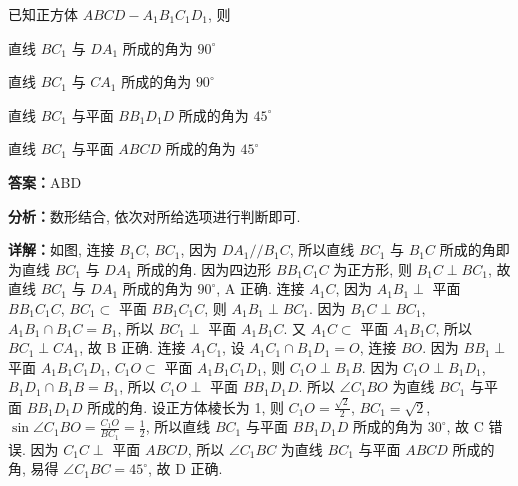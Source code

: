 \begin{question}[points=5]
已知正方体 $ABCD - A_1B_1C_1D_1$, 则
\begin{choices}
  \item 直线 $BC_1$ 与 $DA_1$ 所成的角为 $90^\circ$
  \item 直线 $BC_1$ 与 $CA_1$ 所成的角为 $90^\circ$
  \item 直线 $BC_1$ 与平面 $BB_1D_1D$ 所成的角为 $45^\circ$
  \item 直线 $BC_1$ 与平面 $ABCD$ 所成的角为 $45^\circ$
\end{choices}
\begin{solution}
\textbf{答案：}ABD

\textbf{分析：}数形结合, 依次对所给选项进行判断即可.

\textbf{详解：}如图, 连接 $B_1C$, $BC_1$, 因为 $DA_1 /\!\! / B_1C$, 所以直线 $BC_1$ 与 $B_1C$ 所成的角即为直线 $BC_1$ 与 $DA_1$ 所成的角. 因为四边形 $BB_1C_1C$ 为正方形, 则 $B_1C \perp BC_1$, 故直线 $BC_1$ 与 $DA_1$ 所成的角为 $90^\circ$, A 正确. 连接 $A_1C$, 因为 $A_1B_1 \perp$ 平面 $BB_1C_1C$, $BC_1 \subset$ 平面 $BB_1C_1C$, 则 $A_1B_1 \perp BC_1$. 因为 $B_1C \perp BC_1$, $A_1B_1 \cap B_1C = B_1$, 所以 $BC_1 \perp$ 平面 $A_1B_1C$. 又 $A_1C \subset$ 平面 $A_1B_1C$, 所以 $BC_1 \perp CA_1$, 故 B 正确. 连接 $A_1C_1$, 设 $A_1C_1 \cap B_1D_1 = O$, 连接 $BO$. 因为 $BB_1 \perp$ 平面 $A_1B_1C_1D_1$, $C_1O \subset$ 平面 $A_1B_1C_1D_1$, 则 $C_1O \perp B_1B$. 因为 $C_1O \perp B_1D_1$, $B_1D_1 \cap B_1B = B_1$, 所以 $C_1O \perp$ 平面 $BB_1D_1D$. 所以 $\angle C_1BO$ 为直线 $BC_1$ 与平面 $BB_1D_1D$ 所成的角. 设正方体棱长为 1, 则 $C_1O = \frac{\sqrt{2}}{2}$, $BC_1 = \sqrt{2}$, $\sin\angle C_1BO = \frac{C_1O}{BC_1} = \frac{1}{2}$, 所以直线 $BC_1$ 与平面 $BB_1D_1D$ 所成的角为 $30^\circ$, 故 C 错误. 因为 $C_1C \perp$ 平面 $ABCD$, 所以 $\angle C_1BC$ 为直线 $BC_1$ 与平面 $ABCD$ 所成的角, 易得 $\angle C_1BC = 45^\circ$, 故 D 正确.
\end{solution}
\end{question}

